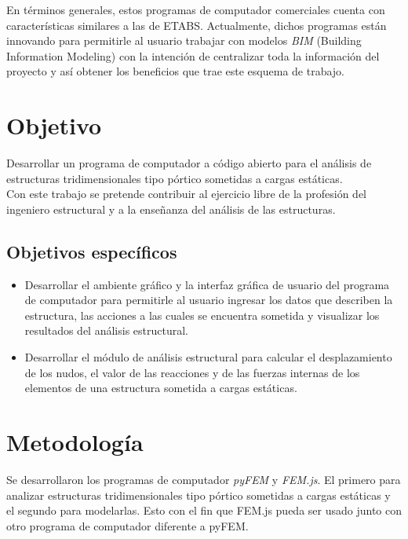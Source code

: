 En términos generales, estos programas de computador comerciales cuenta con características similares a las de ETABS. Actualmente, dichos programas están innovando para permitirle al usuario trabajar con modelos \emph{BIM} (Building Information Modeling) con la intención de centralizar toda la información del proyecto y así obtener los beneficios que trae este esquema de trabajo.\\

\section{Objetivo}

Desarrollar un programa de computador a código abierto para el análisis de estructuras tridimensionales tipo pórtico sometidas a cargas estáticas.\\

Con este trabajo se pretende contribuir al ejercicio libre de la profesión del ingeniero estructural y a la enseñanza del análisis de las estructuras.

\subsection{Objetivos específicos}

\begin{itemize}
\item Desarrollar el ambiente gráfico y la interfaz gráfica de usuario del programa de computador para permitirle al usuario ingresar los datos que describen la estructura, las acciones a las cuales se encuentra sometida y visualizar los resultados del análisis estructural.
\item Desarrollar el módulo de análisis estructural para calcular el desplazamiento de los nudos, el valor de las reacciones y de las fuerzas internas de los elementos de una estructura sometida a cargas estáticas.
\end{itemize}

\section{Metodología}
Se desarrollaron los programas de computador \emph{pyFEM} y \emph{FEM.js}. El primero para analizar estructuras tridimensionales tipo pórtico sometidas a cargas estáticas y el segundo para modelarlas. Esto con el fin que FEM.js pueda ser usado junto con otro programa de computador diferente a pyFEM.\\

